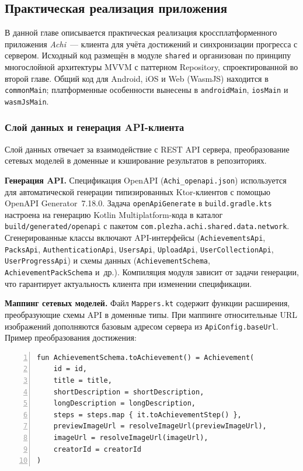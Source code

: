 \documentclass[../main.tex]{subfiles}
\begin{document}
\subsection{Практическая реализация приложения}

В данной главе описывается практическая реализация кроссплатформенного приложения \textit{Achi}~--- клиента для учёта достижений и синхронизации прогресса с сервером. Исходный код размещён в модуле \texttt{shared} и организован по принципу многослойной архитектуры MVVM с паттерном Repository, спроектированной во второй главе. Общий код для Android, iOS и Web (WasmJS) находится в \texttt{commonMain}; платформенные особенности вынесены в \texttt{androidMain}, \texttt{iosMain} и \texttt{wasmJsMain}.

\subsubsection{Слой данных и генерация API-клиента}

Слой данных отвечает за взаимодействие с REST API сервера, преобразование сетевых моделей в доменные и кэширование результатов в репозиториях.

\textbf{Генерация API.} Спецификация OpenAPI (\texttt{Achi\_openapi.json}) используется для автоматической генерации типизированных Ktor-клиентов с помощью OpenAPI Generator~7.18.0. Задача \texttt{openApiGenerate} в \texttt{build.gradle.kts} настроена на генерацию Kotlin Multiplatform-кода в каталог \texttt{build/generated/openapi} с пакетом \texttt{com.plezha.achi.shared.data.network}. Сгенерированные классы включают API-интерфейсы (\texttt{AchievementsApi}, \texttt{PacksApi}, \texttt{AuthenticationApi}, \texttt{UsersApi}, \texttt{UploadApi}, \texttt{UserCollectionApi}, \texttt{UserProgressApi}) и схемы данных (\texttt{AchievementSchema}, \texttt{AchievementPackSchema} и~др.). Компиляция модуля зависит от задачи генерации, что гарантирует актуальность клиента при изменении спецификации.

\textbf{Маппинг сетевых моделей.} Файл \texttt{Mappers.kt} содержит функции расширения, преобразующие схемы API в доменные типы. При маппинге относительные URL изображений дополняются базовым адресом сервера из \texttt{ApiConfig.baseUrl}. Пример преобразования достижения:

\begin{lstlisting}[caption={Маппинг сетевой схемы в доменную модель}, label={lst:mapper}, basicstyle=\small\ttfamily, breaklines=true, frame=single, numbers=left]
fun AchievementSchema.toAchievement() = Achievement(
    id = id,
    title = title,
    shortDescription = shortDescription,
    longDescription = longDescription,
    steps = steps.map { it.toAchievementStep() },
    previewImageUrl = resolveImageUrl(previewImageUrl),
    imageUrl = resolveImageUrl(imageUrl),
    creatorId = creatorId
)
\end{lstlisting}
\end{document}

